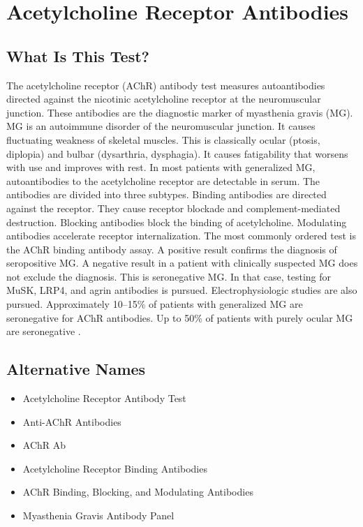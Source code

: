 \chapter{Acetylcholine Receptor Antibodies}

\section*{What Is This Test?}
The acetylcholine receptor (AChR) antibody test measures autoantibodies directed against the nicotinic acetylcholine receptor at the neuromuscular junction. These antibodies are the diagnostic marker of myasthenia gravis (MG). MG is an autoimmune disorder of the neuromuscular junction. It causes fluctuating weakness of skeletal muscles. This is classically ocular (ptosis, diplopia) and bulbar (dysarthria, dysphagia). It causes fatigability that worsens with use and improves with rest. In most patients with generalized MG, autoantibodies to the acetylcholine receptor are detectable in serum. The antibodies are divided into three subtypes. Binding antibodies are directed against the receptor. They cause receptor blockade and complement-mediated destruction. Blocking antibodies block the binding of acetylcholine. Modulating antibodies accelerate receptor internalization. The most commonly ordered test is the AChR binding antibody assay. A positive result confirms the diagnosis of seropositive MG. A negative result in a patient with clinically suspected MG does not exclude the diagnosis. This is seronegative MG. In that case, testing for MuSK, LRP4, and agrin antibodies is pursued. Electrophysiologic studies are also pursued. Approximately 10--15\% of patients with generalized MG are seronegative for AChR antibodies. Up to 50\% of patients with purely ocular MG are seronegative \cite{gilhus2016myasthenia}.

\section*{Alternative Names}
\begin{itemize}
  \item Acetylcholine Receptor Antibody Test
  \item Anti-AChR Antibodies
  \item AChR Ab
  \item Acetylcholine Receptor Binding Antibodies
  \item AChR Binding, Blocking, and Modulating Antibodies
  \item Myasthenia Gravis Antibody Panel
\end{itemize}
